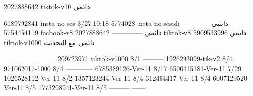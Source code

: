 2027888642 tiktok-v10
دائمي

6189792841 insta no ses
3/27;10:18
5774028 insta no sesidi
دائمي
------------
5754454119 facbook-v8
دائمي
--------------
2027888642 tiktok-v8
دائمي
5909533996 tiktok-v1000
دائمي مع التحديث

__________
209723971 tiktok-v1000
8/1
---------
1926293099-tik-v2
8/4
971062017-1000
8/4
------------
6785389126-Ver-11
8/17
6500415181-Ver-11
7/29
1026528112-Ver-11
8/2
1357123244-Ver-11
8/4
312464417-Ver-11
8/4
6007129520-Ver-11
8/5
1773298941-Ver-11
8/5
---------
------
